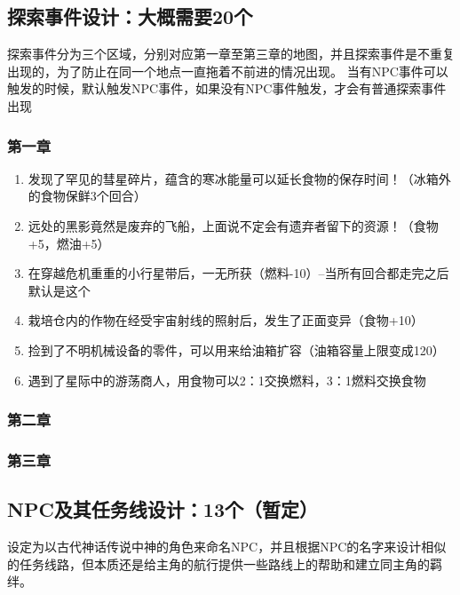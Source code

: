 \documentclass{ctexart}
\begin{document}
		\subsection{探索事件设计：大概需要20个}
			探索事件分为三个区域，分别对应第一章至第三章的地图，并且探索事件是不重复出现的，为了防止在同一个地点一直拖着不前进的情况出现。
			当有NPC事件可以触发的时候，默认触发NPC事件，如果没有NPC事件触发，才会有普通探索事件出现
			\subsubsection{第一章}
				\begin{enumerate}
					\item 发现了罕见的彗星碎片，蕴含的寒冰能量可以延长食物的保存时间！（冰箱外的食物保鲜3个回合）
					\item 远处的黑影竟然是废弃的飞船，上面说不定会有遗弃者留下的资源！（食物+5，燃油+5）
					\item 在穿越危机重重的小行星带后，一无所获（燃料-10）--当所有回合都走完之后默认是这个
					\item 栽培仓内的作物在经受宇宙射线的照射后，发生了正面变异（食物+10）
					\item 捡到了不明机械设备的零件，可以用来给油箱扩容（油箱容量上限变成120）
					\item 遇到了星际中的游荡商人，用食物可以2：1交换燃料，3：1燃料交换食物
				\end{enumerate}
			\subsubsection{第二章}
			\subsubsection{第三章}
		\subsection{NPC及其任务线设计：13个（暂定）} %
		设定为以古代神话传说中神的角色来命名NPC，并且根据NPC的名字来设计相似的任务线路，但本质还是给主角的航行提供一些路线上的帮助和建立同主角的羁绊。%
\end{document}
